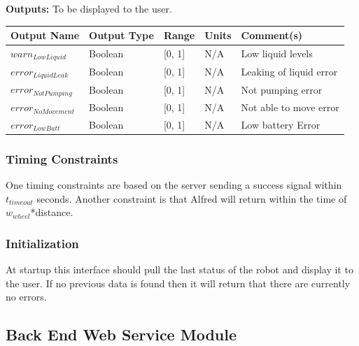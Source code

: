 \documentclass [10pt]{article}
\begin{document}
\textbf{Outputs: } To be displayed to the user.\\
\begin{longtable}{|l|l|l|l|l|}\hline 
	\rowcolor{tableCell}\textbf{Output Name} & \textbf{Output Type} & \textbf{Range} & \textbf{Units} & \textbf{Comment(s)} \\ \hline
	$  warn_{LowLiquid} $ & Boolean & [0, 1]& N/A & Low liquid levels \\ \hline
	\rowcolor{tableCell}$  error_{LiquidLeak} $ & Boolean & [0, 1]& N/A & Leaking of liquid error \\ \hline
	$  error_{NotPumping} $ & Boolean & [0, 1]& N/A & Not pumping error \\ \hline
	\rowcolor{tableCell}$  error_{NoMovement} $ & Boolean & [0, 1]& N/A & Not able to move error \\ \hline
	$  error_{LowBatt} $ & Boolean & [0, 1]& N/A & Low battery Error \\ \hline
\end{longtable}



\subsubsection{Timing Constraints}
One timing constraints are based on the server sending a success signal within  $ t_{timeout} $ seconds. Another constraint is that Alfred will return within the time of $ w_{wheel} $*distance.


\subsubsection{Initialization}
At startup this interface should pull the last status of the robot and display it to the user. If no previous data is found then it will return that there are currently no errors.


\subsection{Back End Web Service Module}
\end{document}
